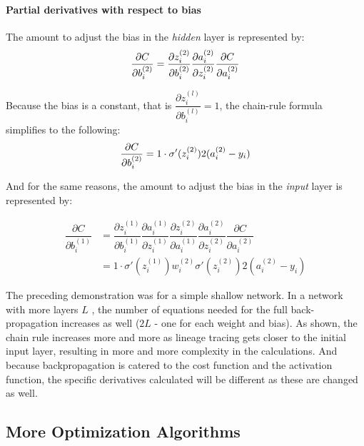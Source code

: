 
\hypertarget{partial-derivatives-with-respect-to-bias}{%
\paragraph{Partial derivatives with respect to
bias}\label{partial-derivatives-with-respect-to-bias}}

The amount to adjust the bias in the \emph{hidden} layer is
represented by: \[
\frac{\partial{C}}{\partial{b_i^{(2)}}}  =  \dfrac{\partial{z_i^{(2)}}}{\partial{b_i^{(2)}}}
     \dfrac{\partial{a_i^{(2)}}}{\partial{z_i^{(2)}}}
     \dfrac{\partial{C}}{\partial{a_i^{(2)}}} \\
\]

Because the bias is a constant, that is
\(\dfrac{\partial{z_i^{(l)}}}{\partial{b_i^{(l)}}} = 1\), the chain-rule
formula simplifies to the following: \[
\frac{\partial{C}}{\partial{b_i^{(2)}}} = 1 \cdot \sigma'(z_i^{(2)}) 2(a_i^{(2)}-y_i) \\
\]

And for the same reasons, the amount to adjust the bias in the \emph{input} layer is
represented by:

    \begin{align*}
\dfrac{\partial{C}}{\partial{b_i^{(1)}}} 
& = \dfrac{\partial{z_i^{(1)}}}{\partial{b_i^{(1)}}} \dfrac{\partial{a_i^{(1)}}}{\partial{z_i^{(1)}}}  \dfrac{\partial{z_i^{(2)}}}{\partial{a_i^{(1)}}}
     \dfrac{\partial{a_i^{(2)}}}{\partial{z_i^{(2)}}}
     \dfrac{\partial{C}}{\partial{a_i^{(2)}}} \\ \nonumber
& = 1 \cdot \sigma'(z_i^{(1)}) w_i^{(2)} \sigma'(z_i^{(2)}) 2(a_i^{(2)}-y_i) \nonumber
    \end{align*}


The preceding demonstration was for a simple shallow network.  In a network with more layers $L$ , the number of equations needed for the full back-propagation increases as well ($2L$ - one for each weight and bias).  As shown, the chain rule increases more and more as lineage tracing gets closer to the initial input layer, resulting in more and more complexity in the calculations.  And because backpropagation is catered to the cost function and the activation function, the specific derivatives calculated will be different as these are changed as well.


\subsection{More Optimization Algorithms}

